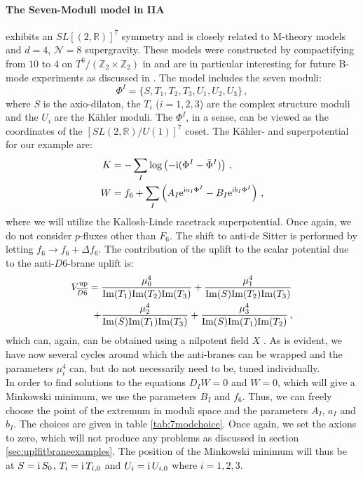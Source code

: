 \documentclass[a4paper,12pt]{report}
\newcommand{\be}{\begin{equation}}
\newcommand{\ee}{\end{equation}}
\newcommand{\bea}{\begin{equation}\begin{aligned}}
\newcommand{\eea}{\end{aligned}\end{equation}}
\def\rmi{{\rm i}}
\def\rme{{\rm e}}
\def\rmim{{\rm Im}}
\begin{document}
\paragraph{The Seven-Moduli model in IIA} exhibits an $SL[(2,\mathbb{R})]^7$ symmetry and is closely related to M-theory models and $d=4$, $\mathcal{N}=8$ supergravity. These models were constructed by compactifying from $10$ to $4$ on $T^6/(\mathbb{Z}_2 \times \mathbb{Z}_2)$ in \cite{Derendinger:2004jn,Villadoro:2005cu} and are in particular interesting for future B-mode experiments as discussed in \cite{Ferrara:2016fwe,Kallosh:2017ced}. The model includes the seven moduli:
\be 
\Phi^I = \{S,T_1,T_2,T_3,U_1,U_2,U_3\}\,,
\ee
where $S$ is the axio-dilaton, the $T_i$ ($i=1,2,3$) are the complex structure moduli and the $U_i$ are the Kähler moduli. The $\Phi^I$, in a sense, can be viewed as the coordinates of the $[SL(2,\mathbb{R})/U(1)]^7$ coset. The Kähler- and superpotential for our example are:
\bea 
\label{eq:massIIA7modpot}
K &= - \sum_I \log \left(-\rmi (\Phi^I -\bar{\Phi}^I)\right)\,,\\
W &= f_6 + \sum_I \left( A_I \rme^{\rmi a_I \Phi^I} - B_I \rme^{\rmi b_I \Phi^I} \right)\,,
\eea 
where we will utilize the Kallosh-Linde racetrack superpotential. Once again, we do not consider $p$-fluxes other than $F_6$. The shift to anti-de Sitter is performed by letting $f_6 \to f_6 + \Delta f_6$. The contribution of the uplift to the scalar potential due to the anti-$D6$-brane uplift is:
\bea
V_{\overline{D6}}^{\text{up}} =\; & \frac{\mu_0^4}{\rmim(T_1)\rmim(T_2)\rmim(T_3)} + \frac{\mu_1^4}{\rmim(S)\rmim(T_2)\rmim(T_3)} \\+ & \frac{\mu_2^4}{\rmim(S)\rmim(T_1)\rmim(T_3)} + \frac{\mu_3^4}{\rmim(S)\rmim(T_1)\rmim(T_2)}\,,
\eea
which can, again, can be obtained using a nilpotent field $X$ \cite{Kallosh:2018nrk,Cribiori:2019bfx}. As is evident, we have now several cycles around which the anti-branes can be wrapped and the parameters $\mu_i^4$ can, but do not necessarily need to be, tuned individually.\\
In order to find solutions to the equations $D_I W =0$ and $W=0$, which will give a Minkowski minimum, we use the parameters $B_I$ and $f_6$. Thus, we can freely choose the point of the extremum in moduli space and the parameters $A_I$, $a_I$ and $b_I$. The choices are given in table \ref{tab:7modchoice}. Once again, we set the axions to zero, which will not produce any problems as discussed in section \ref{sec:uplfitbraneexamples}. The position of the Minkowski minimum will thus be at $S=\rmi \,S_0$, $T_i = \rmi \,T_{i,0}$ and $U_i = \rmi \,U_{i,0}$ where $i=1,2,3$.\\
\end{document}
